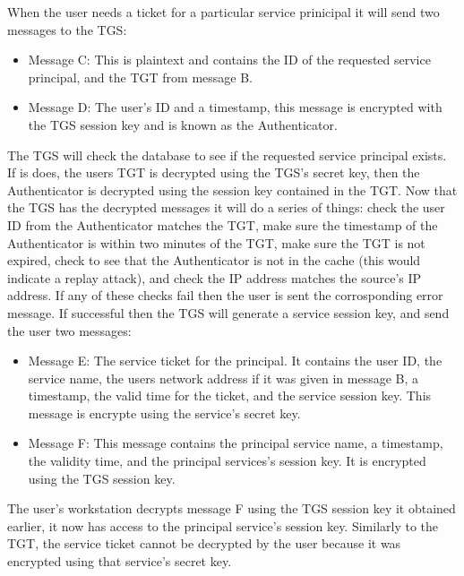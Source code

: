 \documentclass[]{report}   %
\begin{document}
When the user needs a ticket for a particular service prinicipal it will send two messages to the TGS:
\begin{itemize}
\item Message C: This is plaintext and contains the ID of the requested service principal, and the TGT from message B.
\item Message D: The user's ID and a timestamp, this message is encrypted with the TGS session key and is known as the Authenticator.
\end{itemize}

The TGS will check the database to see if the requested service principal exists. If is does, the users TGT is decrypted using the TGS's secret key, then the Authenticator is decrypted using the session key contained in the TGT. Now that the TGS has the decrypted messages it will do a series of things: check the user ID from the Authenticator matches the TGT, make sure the timestamp of the Authenticator is within two minutes of the TGT, make sure the TGT is not expired, check to see that the Authenticator is not in the cache (this would indicate a replay attack), and check the IP address matches the source's IP address. If any of these checks fail then the user is sent the corrosponding error message. If successful then the TGS will generate a service session key, and send the user two messages:

\begin{itemize}
\item Message E: The service ticket for the principal. It contains the user ID, the service name, the users network address if it was given in message B, a timestamp, the valid time for the ticket, and the service session key. This message is encrypte using the service's secret key.
\item Message F: This message contains the principal service name, a timestamp, the validity time, and the principal services's session key. It is encrypted using the TGS session key.
\end{itemize}

The user's workstation decrypts message F using the TGS session key it obtained earlier, it now has access to the principal service's session key. Similarly to the TGT, the service ticket cannot be decrypted by the user because it was encrypted using that service's secret key.
\end{document}
